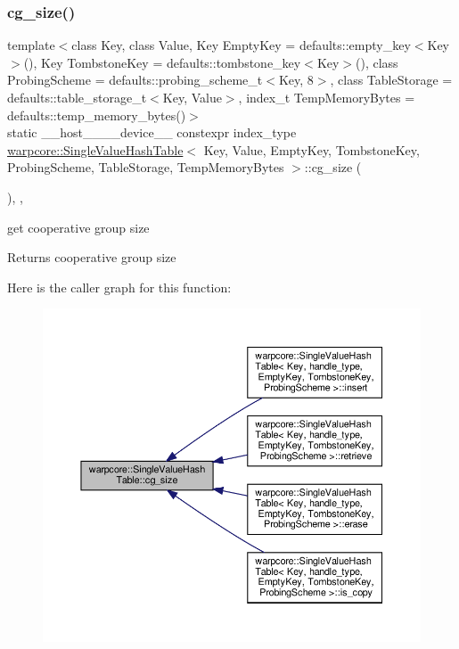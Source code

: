 \subsubsection{\texorpdfstring{cg\+\_\+size()}{cg\_size()}}
{\footnotesize\ttfamily template$<$class Key, class Value, Key Empty\+Key = defaults\+::empty\+\_\+key$<$\+Key$>$(), Key Tombstone\+Key = defaults\+::tombstone\+\_\+key$<$\+Key$>$(), class Probing\+Scheme = defaults\+::probing\+\_\+scheme\+\_\+t$<$\+Key, 8$>$, class Table\+Storage = defaults\+::table\+\_\+storage\+\_\+t$<$\+Key, Value$>$, index\+\_\+t Temp\+Memory\+Bytes = defaults\+::temp\+\_\+memory\+\_\+bytes()$>$ \\
static \+\_\+\+\_\+host\+\_\+\+\_\+\+\_\+\+\_\+device\+\_\+\+\_\+ constexpr index\+\_\+type \hyperlink{classwarpcore_1_1SingleValueHashTable}{warpcore\+::\+Single\+Value\+Hash\+Table}$<$ Key, Value, Empty\+Key, Tombstone\+Key, Probing\+Scheme, Table\+Storage, Temp\+Memory\+Bytes $>$\+::cg\+\_\+size (\begin{DoxyParamCaption}{ }\end{DoxyParamCaption})\hspace{0.3cm}{\ttfamily [inline]}, {\ttfamily [static]}, {\ttfamily [noexcept]}}



get cooperative group size 

\begin{DoxyReturn}{Returns}
cooperative group size 
\end{DoxyReturn}
Here is the caller graph for this function\+:
\nopagebreak
\begin{figure}[H]
\begin{center}
\leavevmode
\includegraphics[width=350pt]{classwarpcore_1_1SingleValueHashTable_aaa4cf7e3252a0b177101fca437e5309e_icgraph}
\end{center}
\end{figure}
\mbox{\label{classwarpcore_1_1SingleValueHashTable_add0eb4b5b495e044affce46b8cb11021}} 
